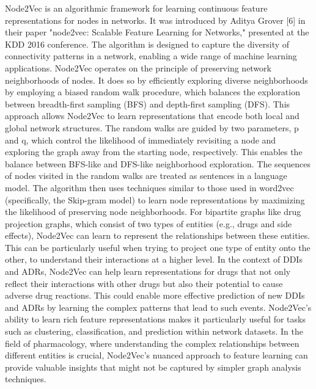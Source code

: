 \documentclass[journal,transmag]{J-NaNA}
\begin{document}
Node2Vec is an algorithmic framework for learning continuous feature representations for nodes in networks. It was introduced by Aditya Grover [6] in their paper "node2vec: Scalable Feature Learning for Networks," presented at the KDD 2016 conference. The algorithm is designed to capture the diversity of connectivity patterns in a network, enabling a wide range of machine learning applications. Node2Vec operates on the principle of preserving network neighborhoods of nodes. It does so by efficiently exploring diverse neighborhoods by employing a biased random walk procedure, which balances the exploration between breadth-first sampling (BFS) and depth-first sampling (DFS). This approach allows Node2Vec to learn representations that encode both local and global network structures. The random walks are guided by two parameters, p and q, which control the likelihood of immediately revisiting a node and exploring the graph away from the starting node, respectively. This enables the balance between BFS-like and DFS-like neighborhood exploration. The sequences of nodes visited in the random walks are treated as sentences in a language model. The algorithm then uses techniques similar to those used in word2vec (specifically, the Skip-gram model) to learn node representations by maximizing the likelihood of preserving node neighborhoods. For bipartite graphs like drug projection graphs, which consist of two types of entities (e.g., drugs and side effects), Node2Vec can learn to represent the relationships between these entities. This can be particularly useful when trying to project one type of entity onto the other, to understand their interactions at a higher level. In the context of DDIs and ADRs, Node2Vec can help learn representations for drugs that not only reflect their interactions with other drugs but also their potential to cause adverse drug reactions. This could enable more effective prediction of new DDIs and ADRs by learning the complex patterns that lead to such events. Node2Vec's ability to learn rich feature representations makes it particularly useful for tasks such as clustering, classification, and prediction within network datasets. In the field of pharmacology, where understanding the complex relationships between different entities is crucial, Node2Vec's nuanced approach to feature learning can provide valuable insights that might not be captured by simpler graph analysis techniques.
\end{document}
